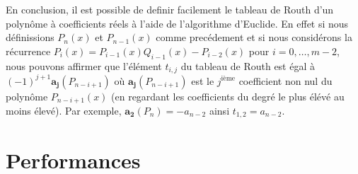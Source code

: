 \documentclass[11pt]{article}
\begin{document}
En conclusion, il est possible de definir facilement le tableau de Routh d'un polynôme à coefficients
réels à l'aide de l'algorithme d'Euclide. En effet si nous définissions $P_n (x)$ et $P_{n-1} (x)$ comme precédement
 et si nous considérons la récurrence $P_i (x) = P_{i-1}(x) Q_{i-1}(x) - P_{i-2}(x)$ pour $i=0,\dots,m-2$, nous pouvons affirmer que l'élément $t_{i,j}$ du tableau
 de Routh est égal à $(-1)^{j+1} \mathbf{a_j}(P_{n-i+1})$ où $\mathbf{a_j}(P_{n-i+1})$ est le $j^{\text{ième}}$ coefficient non nul du polynôme $P_{n-i+1}(x)$ (en regardant les coefficients du degré le plus élévé au moins élevé).
 Par exemple, $\mathbf{a_2}(P_{n}) = -a_{n-2}$ ainsi $t_{1,2} = a_{n-2}$.



\section*{Performances}
\end{document}
